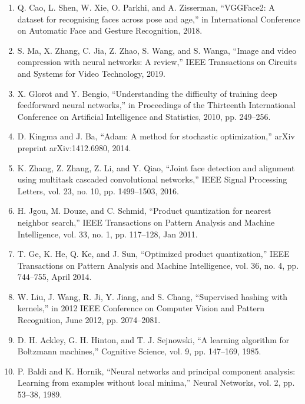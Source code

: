 \documentclass{article}
\begin{document}
\begin{enumerate}
	\item Q. Cao, L. Shen, W. Xie, O. Parkhi, and A. Zisserman, “VGGFace2:
	A dataset for recognising faces across pose and age,” in International
	Conference on Automatic Face and Gesture Recognition, 2018.

	\item S. Ma, X. Zhang, C. Jia, Z. Zhao, S. Wang, and S. Wanga, “Image and
	video compression with neural networks: A review,” IEEE Transactions
	on Circuits and Systems for Video Technology, 2019.

	\item X. Glorot and Y. Bengio, “Understanding the difficulty of training
	deep feedforward neural networks,” in Proceedings of the Thirteenth
	International Conference on Artificial Intelligence and Statistics, 2010,
	pp. 249–256.

	\item D. Kingma and J. Ba, “Adam: A method for stochastic optimization,”
	arXiv preprint arXiv:1412.6980, 2014.

	\item K. Zhang, Z. Zhang, Z. Li, and Y. Qiao, “Joint face detection and
	alignment using multitask cascaded convolutional networks,” IEEE
	Signal Processing Letters, vol. 23, no. 10, pp. 1499–1503, 2016.

	\item H. Jgou, M. Douze, and C. Schmid, “Product quantization for nearest
	neighbor search,” IEEE Transactions on Pattern Analysis and Machine
	Intelligence, vol. 33, no. 1, pp. 117–128, Jan 2011.

	\item T. Ge, K. He, Q. Ke, and J. Sun, “Optimized product quantization,” IEEE
	Transactions on Pattern Analysis and Machine Intelligence, vol. 36,
	no. 4, pp. 744–755, April 2014.

	\item W. Liu, J. Wang, R. Ji, Y. Jiang, and S. Chang, “Supervised hashing
	with kernels,” in 2012 IEEE Conference on Computer Vision and Pattern
	Recognition, June 2012, pp. 2074–2081.
	
	\item D. H. Ackley, G. H. Hinton, and T. J. Sejnowski, “A learning algorithm for Boltzmann machines,” Cognitive Science, vol. 9, pp. 147–169, 1985.

	\item P. Baldi and K. Hornik, “Neural networks and principal component analysis: Learning from
	examples without local minima,” Neural Networks, vol. 2, pp. 53–38, 1989.


\end{enumerate}
\end{document}
